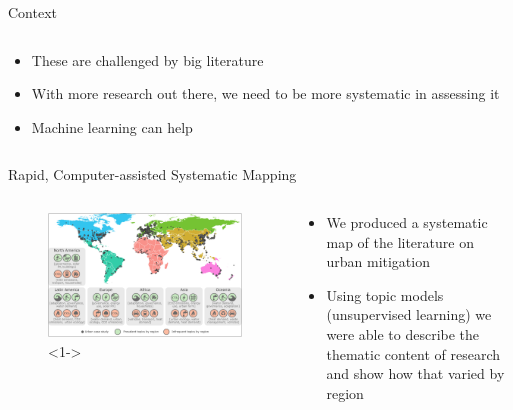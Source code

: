 \documentclass[9pt]{beamer}
\begin{document}
\begin{frame}{Context}
\begin{columns}
\begin{column}{0.312\linewidth}
		\begin{itemize}
			\small
			\item<2->These are challenged by big literature 
			\item<3->With more research out there, we need to be more systematic in assessing it
			\item<4->Machine learning can help
		\end{itemize}
	\end{column}
\end{columns}

\end{frame}


\begin{frame}{Rapid, Computer-assisted Systematic Mapping}



\begin{columns}
	\begin{column}{0.618\linewidth}
		\begin{figure}
			\includegraphics[width=\linewidth]{images/map.png}<1->
		
		\end{figure}
		\small\footnotesize{}
	\end{column}
	\begin{column}{0.312\linewidth}
		\begin{figure}
		\end{figure}
	
	
		
		\begin{itemize}
			\small
			\item<1-> We produced a systematic map of the literature on urban mitigation
			\item<2-> Using topic models (unsupervised learning) we were able to describe the thematic content of research and show how that varied by region
		\end{itemize}
	\end{column}
\end{columns}


\end{frame}
\end{document}
